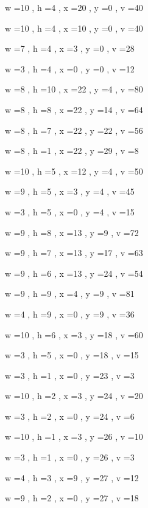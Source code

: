 \documentclass[11pt]{article}
\begin{document}


w =10 , h =4 , x =20 , y =0 , v =40
\par
w =10 , h =4 , x =10 , y =0 , v =40
\par
w =7 , h =4 , x =3 , y =0 , v =28
\par
w =3 , h =4 , x =0 , y =0 , v =12
\par
w =8 , h =10 , x =22 , y =4 , v =80
\par
w =8 , h =8 , x =22 , y =14 , v =64
\par
w =8 , h =7 , x =22 , y =22 , v =56
\par
w =8 , h =1 , x =22 , y =29 , v =8
\par
w =10 , h =5 , x =12 , y =4 , v =50
\par
w =9 , h =5 , x =3 , y =4 , v =45
\par
w =3 , h =5 , x =0 , y =4 , v =15
\par
w =9 , h =8 , x =13 , y =9 , v =72
\par
w =9 , h =7 , x =13 , y =17 , v =63
\par
w =9 , h =6 , x =13 , y =24 , v =54
\par
w =9 , h =9 , x =4 , y =9 , v =81
\par
w =4 , h =9 , x =0 , y =9 , v =36
\par
w =10 , h =6 , x =3 , y =18 , v =60
\par
w =3 , h =5 , x =0 , y =18 , v =15
\par
w =3 , h =1 , x =0 , y =23 , v =3
\par
w =10 , h =2 , x =3 , y =24 , v =20
\par
w =3 , h =2 , x =0 , y =24 , v =6
\par
w =10 , h =1 , x =3 , y =26 , v =10
\par
w =3 , h =1 , x =0 , y =26 , v =3
\par
w =4 , h =3 , x =9 , y =27 , v =12
\par
w =9 , h =2 , x =0 , y =27 , v =18
\par
\newpage
\end{document}
